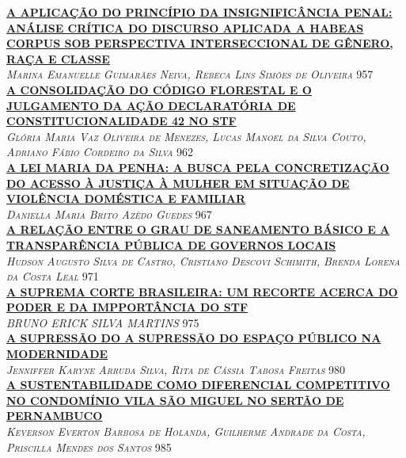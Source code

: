 \noindent \textsc{\hyperlink{trabalhos/251594.pdf.1}{\textbf{A APLICAÇÃO DO PRINCÍPIO DA INSIGNIFICÂNCIA PENAL: ANÁLISE CRÍTICA DO DISCURSO APLICADA A HABEAS CORPUS SOB PERSPECTIVA INTERSECCIONAL DE GÊNERO, RAÇA E CLASSE}}}\\ 
\noindent \textsc{\textit{Marina Emanuelle Guimarães Neiva, Rebeca Lins Simões de Oliveira}} \hfill 957\\ 

\noindent \textsc{\hyperlink{trabalhos/249884.pdf.1}{\textbf{A CONSOLIDAÇÃO DO CÓDIGO FLORESTAL E O JULGAMENTO DA AÇÃO DECLARATÓRIA DE CONSTITUCIONALIDADE 42 NO STF }}}\\ 
\noindent \textsc{\textit{Glória Maria Vaz Oliveira de Menezes, Lucas Manoel da Silva Couto, Adriano Fábio Cordeiro da Silva}} \hfill 962\\ 

\noindent \textsc{\hyperlink{trabalhos/251734.pdf.1}{\textbf{A LEI MARIA DA PENHA: A BUSCA PELA CONCRETIZAÇÃO DO ACESSO À JUSTIÇA À MULHER EM SITUAÇÃO DE VIOLÊNCIA DOMÉSTICA E FAMILIAR}}}\\ 
\noindent \textsc{\textit{Daniella Maria Brito Azêdo Guedes}} \hfill 967\\ 

\noindent \textsc{\hyperlink{trabalhos/251549.pdf.1}{\textbf{A RELAÇÃO ENTRE O GRAU DE SANEAMENTO BÁSICO E A TRANSPARÊNCIA PÚBLICA DE GOVERNOS LOCAIS}}}\\ 
\noindent \textsc{\textit{Hudson Augusto Silva de Castro, Cristiano Descovi Schimith, Brenda Lorena da Costa Leal}} \hfill 971\\ 

\noindent \textsc{\hyperlink{trabalhos/246554.pdf.1}{\textbf{A SUPREMA CORTE BRASILEIRA:  UM RECORTE ACERCA DO PODER E DA IMPPORTÂNCIA DO STF}}}\\ 
\noindent \textsc{\textit{BRUNO ERICK SILVA MARTINS}} \hfill 975\\ 

\noindent \textsc{\hyperlink{trabalhos/249998.pdf.1}{\textbf{A SUPRESSÃO DO A SUPRESSÃO DO ESPAÇO PÚBLICO NA MODERNIDADE}}}\\ 
\noindent \textsc{\textit{Jenniffer Karyne Arruda Silva, Rita de Cássia Tabosa Freitas}} \hfill 980\\ 

\noindent \textsc{\hyperlink{trabalhos/251862.pdf.1}{\textbf{A SUSTENTABILIDADE COMO DIFERENCIAL COMPETITIVO NO CONDOMÍNIO VILA SÃO MIGUEL NO SERTÃO DE PERNAMBUCO}}}\\ 
\noindent \textsc{\textit{Keverson Everton Barbosa de Holanda, Guilherme Andrade da Costa, Priscilla  Mendes dos Santos}} \hfill 985\\ 

